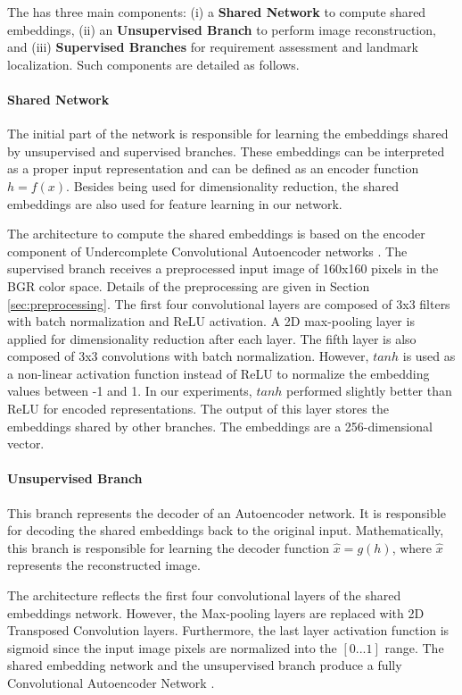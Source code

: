 The \methodname has three main components: (i) a \textbf{Shared Network} to compute shared embeddings, (ii) an \textbf{Unsupervised Branch} to perform image reconstruction, and (iii) \textbf{Supervised Branches} for requirement assessment and landmark localization. Such components are detailed as follows.
 
\paragraph{Shared Network}
 
The initial part of the network is responsible for learning the embeddings shared by unsupervised and supervised branches. These embeddings can be interpreted as a proper input representation and can be defined as an encoder function $h = f(x)$. Besides being used for dimensionality reduction, the shared embeddings are also used for feature learning in our network.
 
The architecture to compute the shared embeddings is based on the encoder component of Undercomplete Convolutional Autoencoder networks \citep[p.~500]{goodfellow2016deep}. The supervised branch receives a preprocessed input image of 160x160 pixels in the BGR color space. Details of the preprocessing are given in Section \ref{sec:preprocessing}. The first four convolutional layers are composed of 3x3 filters with batch normalization and ReLU activation. A 2D max-pooling layer is applied for dimensionality reduction after each layer. The fifth layer is also composed of 3x3 convolutions with batch normalization. However, $tanh$ is used as a non-linear activation function instead of ReLU to normalize the embedding values between -1 and 1. In our experiments, $tanh$ performed slightly better than ReLU for encoded representations. The output of this layer stores the embeddings shared by other branches. The embeddings are a 256-dimensional vector.
 
\paragraph{Unsupervised Branch}
 
This branch represents the decoder of an Autoencoder network. It is responsible for decoding the shared embeddings back to the original input. Mathematically, this branch is responsible for learning the decoder function $\hat{x} = g(h)$, where $\hat{x}$ represents the reconstructed image. 
 
The architecture reflects the first four convolutional layers of the shared embeddings network. However, the Max-pooling layers are replaced with 2D Transposed Convolution layers. Furthermore, the last layer activation function is sigmoid since the input image pixels are normalized into the $[0...1]$ range. The shared embedding network and the unsupervised branch produce a fully Convolutional Autoencoder Network \citep{goodfellow2016deep}.
 
